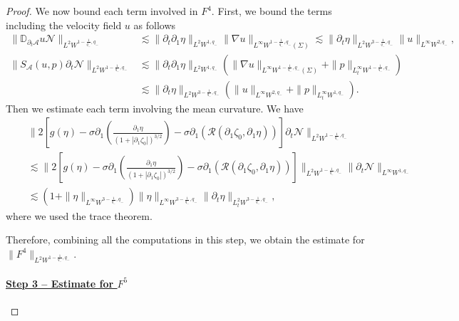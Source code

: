 \documentclass[letterpaper,reqno,10pt,twoside]{amsart}
\theoremstyle{definition}
\theoremstyle{remark}
\def\p{\partial}
\begin{document}
\begin{proof}
	We now bound each term involved in $F^{4}$. First, we bound the terms including the velocity field $u$ as follows
	\[
	\begin{aligned} \|\mathbb{D}_{\p_{t}\mathcal{A}}u\mathcal{N}\|_{L^{2}W^{1-\frac{1}{q_{-}},q_{-}}}&\lesssim\|\partial_{t}\partial_{1}\eta\|_{L^{2}W^{1,q_{-}}}\|\nabla u\|_{L^{\infty}W^{1-\frac{1}{q_{-}},q_{-}}(\Sigma)}\lesssim \|\partial_{t}\eta\|_{L^{2}W^{3-\frac{1}{q_{-}},q_{-}}}\|u\|_{L^{\infty}W^{2,q_{-}}},\\
		\|S_{\mathcal{A}}(u,p)\p_{t}\mathcal{N}\|_{L^{2}W^{1-\frac{1}{q_{-}},q_{-}}} &\lesssim \|\partial_{t}\partial_{1}\eta\|_{L^{2}W^{1,q_{-}}}(\|\nabla u\|_{L^{\infty}W^{1-\frac{1}{q_{-}},q_{-}}(\Sigma)}+\| p\|_{L_{t}^{\infty}W^{1-\frac{1}{q_{-}},q_{-}}})\\
		&\lesssim \|\partial_{t}\eta\|_{L^{2}W^{3-\frac{1}{q_{-}},q_{-}}}(\|u\|_{L^{\infty}W^{2,q_{-}}}+\|p\|_{L_{t}^{\infty}W^{1,q_-{}}}).
	\end{aligned}
	\]
	\noindent Then we estimate each term involving the mean curvature. We have
	\[
	\begin{aligned}
		&\|2\left[g(\eta)-\sigma\p_1\left(\frac{\p_1\eta}{(1+|\p_1\zeta_0|)^{3/2}}\right)-\sigma\partial_{1}(\mathcal{R}(\partial_{1}\zeta_{0},\partial_{1}\eta))\right]\p_t\mathcal{N}\|_{L^{2}W^{1-\frac{1}{q_{-}},q_{-}}}\\
		\quad &\lesssim \|2\left[g(\eta)-\sigma\p_1\left(\frac{\p_1\eta}{(1+|\p_1\zeta_0|)^{3/2}}\right)-\sigma\partial_{1}(\mathcal{R}(\partial_{1}\zeta_{0},\partial_{1}\eta))\right]\|_{L^{2}W^{1-\frac{1}{q_{-}},q_{-}}}\|\p_{t}\mathcal{N}\|
		_{L^{\infty}W^{1,q_{-}}}   \\
		\quad &\lesssim  (1+\|\eta\|_{L^{\infty}W^{3-\frac{1}{q_{-}},q_{-}}})\|\eta\|_{L^{\infty}W^{3-\frac{1}{q_{-}},q_{-}}}\|\p_{t}\eta\|_{L_{t}^{2}W^{3-\frac{1}{q_{-}},q_{-}}},
	\end{aligned}
	\]
	where we used the trace theorem. 
	
	Therefore, combining all the computations in this step, we obtain the estimate for $\|F^{4}\|_{L^{2}W^{1-\frac{1}{q_{-}},q_{-}}}$.
		
		\paragraph{\underline{Step 3 -- Estimate for $F^{5}$}}
		

\end{proof}
\end{document}
